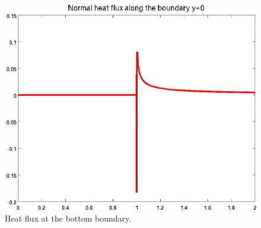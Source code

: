 \begin{figure}[!h]
\centering
\includegraphics[scale=.45]{figs/Re1000p2/heatflux.png}
\caption{Heat flux at the bottom boundary.}
\end{figure}
